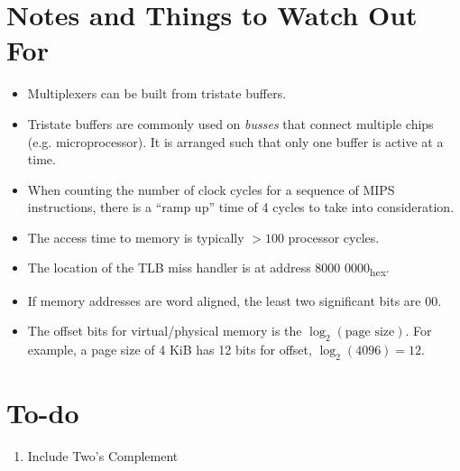 \documentclass[12pt]{article}
\theoremstyle{definition}
\begin{document}
  \section{Notes and Things to Watch Out For}
  \begin{itemize}
    \item Multiplexers can be built from tristate buffers.
    \item Tristate buffers are commonly used on \emph{busses} that connect multiple chips (e.g. microprocessor).
    It is arranged such that only one buffer is active at a time.
    \item When counting the number of clock cycles for a sequence of MIPS instructions, there is a ``ramp up'' time of 4 cycles to take into consideration.
    \item The access time to memory is typically $> 100$ processor cycles.
    \item The location of the TLB miss handler is at address 8000 0000\textsubscript{hex}.
    \item If memory addresses are word aligned, the least two significant bits are 00.
    \item The offset bits for virtual/physical memory is the $\log_2(\text{page size})$. For example, a page size of 4 KiB has 12 bits for offset, $\log_2(4096) = 12$.
  \end{itemize}

  \newpage
  \section{To-do}
  \begin{enumerate}
    \item Include Two's Complement
  \end{enumerate}
\end{document}
